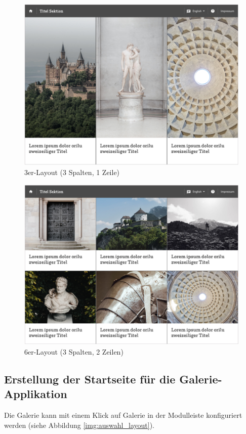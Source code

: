 \begin{figure}[ht!]
\centering
\includegraphics[width=12cm]{Figures/paula/galerie/layout_3er.png}
\caption{3er-Layout (3 Spalten, 1 Zeile)}
\label{img:layout_3er}
\end{figure}

\begin{figure}[ht!]
\centering
\includegraphics[width=12cm]{Figures/paula/galerie/layout_6er.png}
\caption{6er-Layout (3 Spalten, 2 Zeilen)}
\label{img:layout_6er}
\end{figure}


\subsection{Erstellung der Startseite für die Galerie-Applikation}

Die Galerie kann mit einem Klick auf Galerie in der Modulleiste konfiguriert werden (siehe Abbildung \ref{img:auswahl_layout}).


